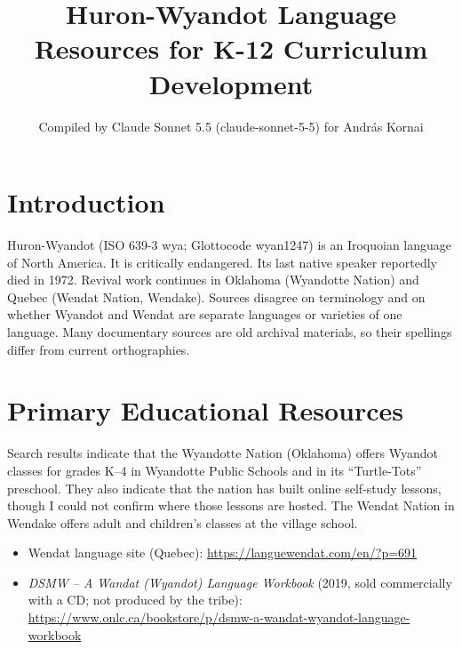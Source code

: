 \documentclass[12pt]{article}
\title{Huron-Wyandot Language Resources for K-12 Curriculum Development}
\author{Compiled by Claude Sonnet 5.5 (claude-sonnet-5-5) for Andr\'as Kornai}
\date{}
\begin{document}
\maketitle

\section{Introduction}
Huron-Wyandot (ISO 639-3 wya; Glottocode wyan1247) is an Iroquoian language of North America. It is critically endangered. Its last native speaker reportedly died in 1972. Revival work continues in Oklahoma (Wyandotte Nation) and Quebec (Wendat Nation, Wendake). Sources disagree on terminology and on whether Wyandot and Wendat are separate languages or varieties of one language. Many documentary sources are old archival materials, so their spellings differ from current orthographies.

\section{Primary Educational Resources}
Search results indicate that the Wyandotte Nation (Oklahoma) offers Wyandot classes for grades K--4 in Wyandotte Public Schools and in its ``Turtle-Tots'' preschool. They also indicate that the nation has built online self-study lessons, though I could not confirm where those lessons are hosted. The Wendat Nation in Wendake offers adult and children's classes at the village school.
\begin{itemize}
\item Wendat language site (Quebec): \url{https://languewendat.com/en/?p=691}
\item \emph{DSMW -- A Wandat (Wyandot) Language Workbook} (2019, sold commercially with a CD; not produced by the tribe): \url{https://www.onlc.ca/bookstore/p/dsmw-a-wandat-wyandot-language-workbook}
\end{itemize}
\end{document}
